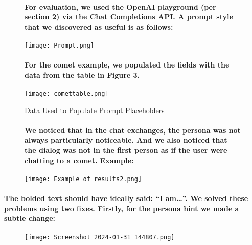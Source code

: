 \documentclass{article}
\begin{document}
\begin{figure}[htbp]

\paragraph{For evaluation, we used the OpenAI playground (per section 2) via the Chat Completions API. A prompt style that we discovered as useful is as follows:}

    \centering
    \texttt{[image: Prompt.png]}
    \label{fig:prompt}
\end{figure}

\newpage

\begin{figure}[htbp]
\paragraph{For the comet example, we populated the fields with the data from the table in Figure 3. \newline}

    \centering
    \texttt{[image: comettable.png]}
    \caption{Data Used to Populate Prompt Placeholders}
    \label{fig:Table1}
\end{figure}

\begin{figure}[htbp]

\paragraph{We noticed that in the chat exchanges, the persona was not always particularly noticeable. And we also noticed that the dialog was not in the first person as if the user were chatting to a comet. Example:\newline}

    \centering
    \texttt{[image: Example of results2.png]}
    \label{fig:example2}
\end{figure}

\paragraph{The bolded text should have ideally said: “I am…”. We solved these problems using two fixes. Firstly, for the persona hint we made a subtle change:\\}

\newpage

\begin{figure}[h]
    \centering
    \texttt{[image: Screenshot 2024-01-31 144807.png]}
    \label{fig:enter-22}
    \vspace{-40pt} %
\end{figure}
\end{document}
